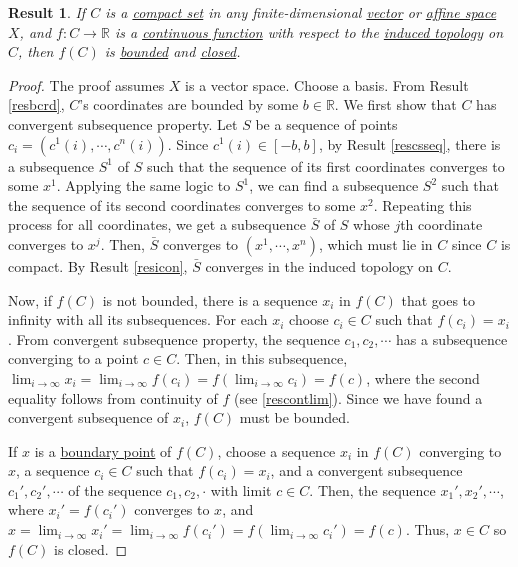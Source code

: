 \documentclass[letterpaper,12pt]{article}
\theoremstyle{plain}
\newtheorem{res}{Result}
\theoremstyle{plain}
\theoremstyle{definition}
\begin{document}
\begin{res}
If $C$ is a \hyperref[defcmpc]{compact set} in any finite-dimensional \hyperref[defrvs]{vector} or \hyperref[defafsp]{affine space} $X$, and $f:C\rightarrow \mathbb{R}$ is a \hyperref[rescontf]{continuous function} with respect to the \hyperref[defitop]{induced topology} on $C$, then $f(C)$ is \hyperref[defbnd]{bounded} and \hyperref[defcset]{closed}.
\end{res}
\begin{proof}
The proof assumes $X$ is a vector space. Choose a basis. From Result \ref{resbcrd}, $C$'s coordinates are bounded by some $b\in \mathbb{R}$. We first show that $C$ has convergent subsequence property. Let $S$ be a sequence of points $c_i=(c^1(i),\cdots,c^n(i))$. Since $c^1(i)\in [-b,b]$, by Result \ref{rescsseq}, there is a subsequence $S^1$ of $S$ such that the sequence of its first coordinates converges to some $x^1$. Applying the same logic to $S^1$, we can find a subsequence $S^2$ such that the sequence of its second coordinates converges to some $x^2$. Repeating this process for all coordinates, we get a subsequence $\bar{S}$ of $S$ whose $j$th coordinate converges to $x^j$. Then, $\bar{S}$ converges to $(x^1,\cdots,x^n)$, which must lie in $C$ since $C$ is compact. By Result \ref{resicon}, $\bar{S}$ converges in the induced topology on $C$.

Now, if $f(C)$ is not bounded, there is a sequence $x_i$ in $f(C)$ that goes to infinity with all its subsequences. For each $x_i$ choose $c_i\in C$ such that $f(c_i)=x_i$. From convergent subsequence property, the sequence $c_1,c_2,\cdots$ has a subsequence converging to a point $c\in C$. Then, in this subsequence, $\lim_{i\to\infty}x_i= \lim_{i\to\infty}f(c_i)= f(\lim_{i\to\infty}c_i)=f(c)$, where the second equality follows from continuity of $f$ (see \autoref{rescontlim}). Since we have found a convergent subsequence of $x_i$, $f(C)$ must be bounded.

If $x$ is a \hyperref[defbpnt]{boundary point} of $f(C)$, choose a sequence $x_i$ in $f(C)$ converging to $x$, a sequence $c_i\in C$ such that $f(c_i)=x_i$, and a convergent subsequence $c_1',c_2',\cdots$ of the sequence $c_1,c_2,\cdot$ with limit $c\in C$. Then, the sequence $x_1',x_2',\cdots$, where $x_i'=f(c_i')$ converges to $x$, and $x=\lim_{i\to \infty}x_i'=\lim_{i\to \infty}f(c_i')=f(\lim_{i\to \infty}c_i')=f(c)$. Thus, $x\in C$ so $f(C)$ is closed.
\end{proof}

\clearpage
\end{document}
